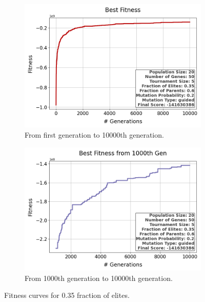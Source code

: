 \documentclass{assignment}
\begin{document}
\begin{figure}[H]
    \begin{subfigure}{0.5\textwidth}
        \includegraphics[width=\textwidth]{figures/best_fitness_output_20_50_5_0.35_0.6_0.2_guided.png}
        \caption{From first generation to 10000th generation.}
    \end{subfigure}\hfill
    \begin{subfigure}{0.5\textwidth}
        \includegraphics[width=\textwidth]{figures/best_fitness_1000_output_20_50_5_0.35_0.6_0.2_guided.png}
        \caption{From 1000th generation to 10000th generation.}
    \end{subfigure}
    \caption{Fitness curves for 0.35 fraction of elites.}
\label{fig:0.35elites}
\end{figure}
\end{document}
